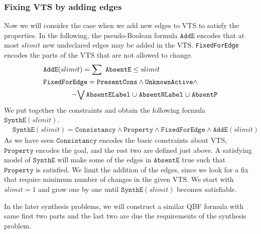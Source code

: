 \subsubsection{Fixing VTS by adding edges}
%
Now we will consider the case when we add new edges to VTS to satisfy the properties.
%
In the following, the pseudo-Boolean formula $\texttt{AddE}$ encodes
that at most $slimit$ new undeclared edges may be added in the VTS.
%
\texttt{FixedForEdge} encodes the parts of the VTS that are not allowed to change.
\begin{align*}
  &\texttt{AddE}(slimit) = \sum~\texttt{AbsentE} \leq slimit\\
  &\texttt{FixedForEdge} = \texttt{PresentCons} \land \texttt{UnknownActive} \land\\
   & \quad\quad\quad\quad \lnot \bigvee \texttt{AbsentELabel} \;{\cup}\;
                    \texttt{AbsentNLabel} \;{\cup}\;
                    \texttt{AbsentP}
\end{align*}
We put together the constraints and obtain the following formula $\texttt{SynthE}(slimit)$.
\begin{align*}
  & \texttt{SynthE}(slimit) =
       \texttt{Consistancy}\land \texttt{Property} \land
   \texttt{FixedForEdge} \land
  \texttt{AddE}(slimit)
\end{align*}
As we have seen $\texttt{Consistancy}$ encodes the basic constraints about VTS,
$\texttt{Property}$ encodes the goal, and
the rest two are defined just above.
%
A satisfying model of $\texttt{SynthE}$ will make 
some of the edges in $\texttt{AbsentE}$ true such that~$\texttt{Property}$ is satisfied.
%
We limit the addition of the edges, since we look for a fix that require minimum number
of changes in the given VTS.
%
We start with $slimit = 1$ and grow one by one until $\texttt{SynthE}(slimit)$
becomes satisfiable.

In the later synthesis problems, we will construct a similar QBF
formula with same first two parts and the last two are due the
requirements of the synthesis problem.

